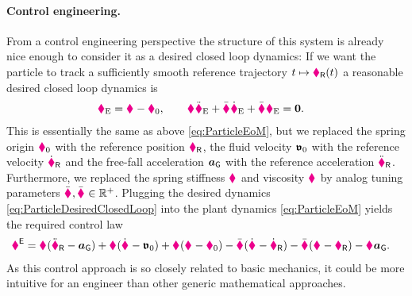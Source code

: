 \paragraph{Control engineering.}
From a control engineering perspective the structure of this system is already nice enough to consider it as a desired closed loop dynamics:
If we want the particle to track a sufficiently smooth reference trajectory $t\mapsto\particlePosR{}(t)$ a reasonable desired closed loop dynamics is
\begin{align}\label{eq:ParticleDesiredClosedLoop}
 \particlePosE{} = \particlePos{} - \particlePos{0},
\qquad
 \particleMass{} \particlePosEdd{} + \particleDampingC{} \particlePosEd{} + \particleStiffnessC{} \particlePosE{} &= \tuple{0}.
\end{align}
This is essentially the same as above \eqref{eq:ParticleEoM}, but we replaced the spring origin $\particlePos{0}$ with the reference position $\particlePosR{}$, the fluid velocity $\tuple{\mathfrak{v}}_0$ with the reference velocity $\particlePosRd{}$ and the free-fall acceleration $\gravityAcc$ with the reference acceleration $\particlePosRdd{}$.
Furthermore, we replaced the spring stiffness $\particleStiffness{}$ and viscosity $\particleDamping{}$ by analog tuning parameters $\particleStiffnessC{}, \particleDampingC{} \in \RealNum^+$.
Plugging the desired dynamics \eqref{eq:ParticleDesiredClosedLoop} into the plant dynamics \eqref{eq:ParticleEoM} yields the required control law
\begin{align}
 \particleForceEx{} &= \particleMass{} (\particlePosRdd{} - \gravityAcc) + \particleDamping{} (\particlePosd{} - \tuple{\mathfrak{v}}_0) + \particleStiffness{} (\particlePos{} - \particlePos{0}) - \particleDampingC{} (\particlePosd{} - \particlePosRd{}) - \particleStiffnessC{} (\particlePos{} - \particlePosR{}) -\particleMass{}\gravityAcc.
\end{align}
As this control approach is so closely related to basic mechanics, it could be more intuitive for an engineer than other generic mathematical approaches.


